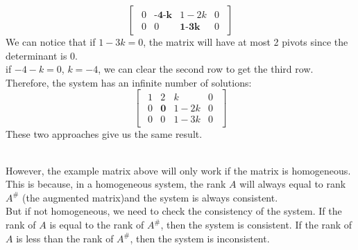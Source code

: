 \documentclass[oneside]{book}
\begin{document}
{\[\begin{bmatrix}
\begin{array}{ccc|c}
                0 & \textbf{-4-k} & 1-2k & 0\\
                0 & 0 & \textbf{1-3k} & 0
            \end{array}
        \end{bmatrix}
    \]
    We can notice that if $1-3k = 0$, the matrix will have at most 2 pivots since the determinant is 0. \\
    if $-4-k = 0$, $k = -4$, we can clear the second row to get the third row. Therefore, the system has an infinite number of solutions:\\ 
    \[
        \begin{bmatrix}
            \begin{array}{ccc|c}
                1& 2 & k & 0\\
                0 & \textbf{0}& 1-2k & 0\\
                0 & 0 & 1-3k & 0
            \end{array}
        \end{bmatrix}
    \]
    These two approaches give us the same result. 

}
\\ 
However, the example matrix above will only work if the matrix is homogeneous.  \\

This is because, in a homogeneous system, the rank $A$ will always equal to rank $A^{\#}$ (the augmented matrix)and the system is always consistent.\\

But if not homogeneous, we need to check the consistency of the system. If the rank of $A$ is equal to the rank of $A^{\#}$, then the system is consistent. If the rank of $A$ is less than the rank of $A^{\#}$, then the system is inconsistent.\\
\end{document}
